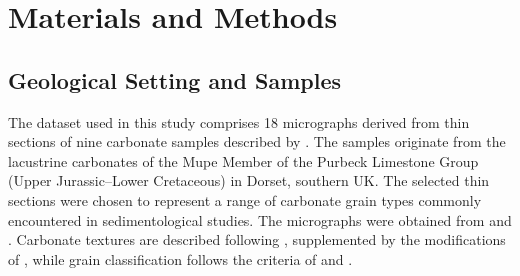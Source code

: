\documentclass[a4paper,fleqn]{cas-dc}
\begin{document}
\section{Materials and Methods}

\subsection{Geological Setting and Samples}

The dataset used in this study comprises 18 micrographs derived from thin sections of nine carbonate samples described by \citet{ac7}. The samples originate from the lacustrine carbonates of the Mupe Member of the Purbeck Limestone Group (Upper Jurassic--Lower Cretaceous) in Dorset, southern UK. The selected thin sections were chosen to represent a range of carbonate grain types commonly encountered in sedimentological studies. The micrographs were obtained from \citet{gallois2016} and \citet{gallois2018}. Carbonate textures are described following \citet{dunham1962}, supplemented by the modifications of \citet{embry1971}, while grain classification follows the criteria of \citet{bathurst1971} and \citet{flugel2010}.
\end{document}
